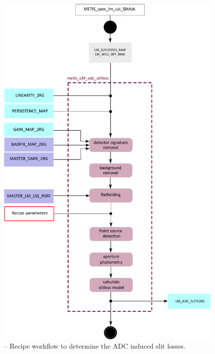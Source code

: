 \begin{figure}[ht]
  \centering
  \includegraphics[width=0.5\textheight]{figures/metis_lm_adc_slitloss_v0.83.pdf}
  \caption[Recipe: ]{ --
    Recipe workflow to determine the \ac{ADC} induced slit losses.}
  \label{Fig:rec_lm_adc_slitloss}
\end{figure}

